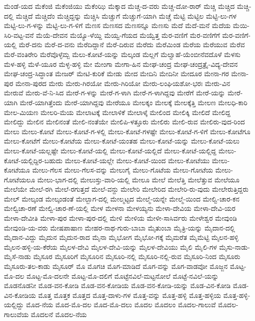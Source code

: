 ಮೆಂಡೆ-ಯದ
ಮೆಕೆಂಜಿ
ಮೆಕೆಂಜಿಯು
ಮೆಕೆಂಝಿ
ಮೆಕ್ಕಾದ
ಮೆಚ್ಚ-ದ-ವರು
ಮೆಚ್ಚ-ದೋ-ರಾರ್
ಮೆಚ್ಚಿ
ಮೆಚ್ಚಿದ
ಮೆಚ್ಚಿ-ದಲ್ಲಿ
ಮೆಚ್ಚಿದೆ
ಮೆಚ್ಚಿದೆಂ
ಮೆಚ್ಚಿದ್ದನ್ನು
ಮೆಚ್ಚಿಸಿ
ಮೆಚ್ಚುಗೆ
ಮೆಚ್ಚುಗೆ-ಯಾಗಿ
ಮೆಚ್ಚೆ
ಮೆಟ್ಟಿ
ಮೆಟ್ಟಿಲ
ಮೆಟ್ಟಿ-ಲು-ಗಳ
ಮೆಟ್ಟಿ-ಲು-ಗ-ಳನ್ನು
ಮೆಟ್ಟಿ-ಲು-ಗ-ಳಿಗೆ
ಮೆಣಸ
ಮೆಣಸದ
ಮೆಣಸನ್ನೂ
ಮೆಣಸು
ಮೆದೆ
ಮೆದೆ-ಮನೆ
ಮೆದೆಯ
ಮೆಯಿ-ಸಿರಿ-ವಟ್ಟ-ವನೆ
ಮೆಯೆ-ದೇವನ
ಮೆಯ್ಯೊ-ಳೆಯ್ದಿ
ಮೆಯ್ವ-ಗೆಯದ
ಮೆಯ್ವೆತ್ತ
ಮೆರ-ವಣಿಗೆ
ಮೆರ-ವಣಿಗೆಗೆ
ಮೆರ-ವಣಿಗೆ-ಯಲ್ಲಿ
ಮೆರೆ-ದನು
ಮೆರೆ-ದ-ವನು
ಮೆರೆದಿದ್ದಾನೆ
ಮೆರೆ-ದಿರುವ
ಮೆರೆದು
ಮೆರೆಮಿಂಡ
ಮೆರೆಯ
ಮೆರೆಯುವ
ಮೆರೆವ
ಮೆರೆ-ವಂತಿರೇರಿ
ಮೆರೆವೊಳ್ಳೆಮ್ಬ
ಮೆಲು-ಕೋಟೆ-ಯನ್ನು
ಮೆಲ್ಕಂಡ
ಮೆಲ್ಲಗೆ
ಮೆಲ್ವಾಹೆ-ಯೆಂಬೀನೆವದೊಳೆ
ಮೆಳಸು
ಮೆಳ-ಹಳ್ಳಿ
ಮೆಳೆ-ಯೂರ
ಮೆಳ್ಳ-ಹಳ್ಳಿ
ಮೇ
ಮೇಂಗಾ
ಮೇಗಾ-ಹಿನ
ಮೇಘ-ಚಂದ್ರ
ಮೇಘ-ಚಂದ್ರತ್ರೈ-ವಿದ್ಯ-ದೇವನ
ಮೇಘ-ಚಂದ್ರ-ಸಿದ್ಧಾಂತ
ಮೇಜರ್
ಮೇಟಿ-ಕುರಿಕೆ
ಮೇಡು
ಮೇದ
ಮೇದಿನಿ
ಮೇದಿನೀ
ಮೇದೂರ
ಮೇನಾ-ಗರ
ಮೇನಾ-ಪುರ
ಮೇನಾ-ಪುರದ
ಮೇರು
ಮೇರು-ಗಿರಯೋ
ಮೇರು-ಗಿರಿಯೋ
ಮೇರು-ಲಂಘಿಯಶೋ-ಭರಃ
ಮೇರು-ವಿನ
ಮೇರುವೆ
ಮೇರು-ವೆ-ನಿ-ಸಿದ
ಮೇರೆ-ಗ-ಳನ್ನು
ಮೇರೆ-ಗ-ಳಾಗಿ
ಮೇರೆ-ಗ-ಳಾಗಿದ್ದವು
ಮೇರೆಗೆ
ಮೇರೆ-ಯನ್ನು
ಮೇರೆ-ಯಾಗಿ
ಮೇರೆ-ಯಾಗಿತ್ತೆಂದು
ಮೇರೆ-ಯಾಗಿದ್ದವು
ಮೇರೆಯೂ
ಮೇಲಕ್ಕಂ
ಮೇಲಕ್ಕೆ
ಮೇಲಕ್ಕೆತ್ತಿ
ಮೇಲಣ
ಮೇಲಧಿ-ಕಾರಿ
ಮೇಲ-ಮಿಯಣ
ಮೇಲರಿ-ಮೆಯ
ಮೇಲಾಟಕ್ಕೆ
ಮೇಲಾಳಿಕೆ
ಮೇಲಾಳ್ಕೆ
ಮೇಲಿಂದ
ಮೇಲಿಕ್ಕಿ
ಮೇಲಿದೆ
ಮೇಲಿದ್ದ
ಮೇಲಿದ್ದು
ಮೇಲಿನ
ಮೇಲಿನಂತೆ
ಮೇಲಿ-ನಂತೆಯೇ
ಮೇಲಿಪಿ-ಳತ್ತೂರು
ಮೇಲಿರು
ಮೇಲಿ-ರುವ
ಮೇಲಿರು-ವುದ-ರಿಂದ
ಮೇಲು
ಮೇಲು-ಕೋಟೆ
ಮೇಲು-ಕೋಟೆ-ಗ-ಳಲ್ಲಿ
ಮೇಲು-ಕೋಟೆ-ಗಳಷ್ಟೇ
ಮೇಲು-ಕೋಟೆ-ಗ-ಳಿಗೆ
ಮೇಲು-ಕೋಟೆಗೂ
ಮೇಲು-ಕೋಟೆಗೆ
ಮೇಲು-ಕೋಟೆಯ
ಮೇಲು-ಕೋಟೆ-ಯಂತಹ
ಮೇಲು-ಕೋಟೆ-ಯನ್ನು
ಮೇಲು-ಕೋಟೆ-ಯಲು
ಮೇಲು-ಕೋಟೆ-ಯಲ್ಲಷ್ಟೇ
ಮೇಲು-ಕೋಟೆ-ಯಲ್ಲಿ
ಮೇಲು-ಕೋಟೆ-ಯಲ್ಲಿದೆ
ಮೇಲು-ಕೋಟೆ-ಯಲ್ಲಿದ್ದ
ಮೇಲು-ಕೋಟೆ-ಯಲ್ಲಿದ್ದಿರ-ಬಹುದು
ಮೇಲು-ಕೋಟೆ-ಯಲ್ಲೇ
ಮೇಲು-ಕೋಟೆ-ಯಿಂದ
ಮೇಲು-ಕೋಟೆಯು
ಮೇಲು-ಕೋಟೆಯೂ
ಮೇಲು-ಗೆಲಸ
ಮೇಲು-ಗೆಲಸ-ವನ್ನು
ಮೇಲುಗೈ
ಮೇಲು-ಗೊಟೆಯ
ಮೇಲು-ಗೋಟೆಯ
ಮೇಲು-ಗೋಟೆಯಲೂ
ಮೇಲು-ಭಾಗ-ದಲ್ಲಿ
ಮೇಲುಸ್ತು-ವಾರಿ-ಯಲ್ಲಿ
ಮೇಲೂ
ಮೇಲೆ
ಮೇಲೆತ್ತಿ
ಮೇಲೆತ್ತುವ
ಮೇಲೆಯೂ
ಮೇಲೆಯೇ
ಮೇಲೆ-ರಗಿ
ಮೇಲೆ-ರಗುತ್ತದೆ
ಮೇಲೆ-ವನ್ದು
ಮೇಲೇರಿ
ಮೇಲೇರಿದ
ಮೇಲೇರಿ-ರು-ವುದು
ಮೇಲೇರುತ್ತಿದ್ದರು
ಮೇಲ್
ಮೇಲ್ಕಂಡ
ಮೇಲ್ಕಂಡಂತೆ
ಮೇಲ್ಬಾಗ-ದಲ್ಲಿ
ಮೇಲ್ಮಟ್ಟದ
ಮೇಲ್ಮೆ-ಯನ್ನೇ
ಮೇಲ್ಮೆ-ಯಿಂದ
ಮೇಲ್ವಿ-ಚಾರ-ಕನ
ಮೇಲ್ವಿಚಾ-ರಣೆ
ಮೇಲ್ವಿ-ಚಾರ-ಣೆ-ಯಲ್ಲಿ
ಮೇಳ
ಮೇಳನಾ
ಮೇಳಯ್ಯನು
ಮೇಳಾ-ದೇವಿಯ
ಮೇಳಾ-ದೇವಿ-ಯರ
ಮೇಳಾ-ದೇವೀತಿ
ಮೇಳಾ-ಪುರ
ಮೇಳಾ-ಪುರ-ದಲ್ಲಿ
ಮೇಳಿ
ಮೇಳಿಯ
ಮೇಳೀ-ಸಾಸಿರ್ವರು
ಮೇಳೇಶ್ವರ
ಮೇವುಂಡಿ
ಮೇವುಂಡಿ-ಯ-ವರು
ಮೇಷಪಾಷಾಣ
ಮೇಹರ-ನಾಥ-ಗುರು-ಬಾಬಾ
ಮೈತುಂಬಾ
ಮೈತ್ರಿ-ಯನ್ನು
ಮೈದಾನ-ದಲ್ಲಿ
ಮೈದಾನ-ವಿದ್ದು
ಮೈದುನ
ಮೈದುನ-ರಾದ
ಮೈನಾ
ಮೈಭೋಗ
ಮೈಭೋ-ಗಕ್ಕೆ
ಮೈಮರೆತ
ಮೈಮೆಟ್ಟಿ
ಮೈಲನ-ಹಳ್ಳಿ
ಮೈಲನ-ಹಳ್ಳಿ-ಯ-ಕೆರೆಯ
ಮೈಲಳ-ದೇವಿ
ಮೈಲಳ-ದೇವಿ-ಯನ್ನು
ಮೈಲಳ-ದೇವಿಯು
ಮೈಲಿ
ಮೈಲಿ-ಗಳ
ಮೈಸು-ನಾಡು-ಮೈಸೆ-ನಾಡು
ಮೈಸೂರ
ಮೈಸೂರಿಗೆ
ಮೈಸೂರಿನ
ಮೈಸೂರಿ-ನಲ್ಲಿ
ಮೈಸೂರಿ-ನಲ್ಲಿ-ರುವ
ಮೈಸೂರಿ-ನಿಂದ
ಮೈಸೂರು
ಮೈಸೂರು-ತಲ-ಕಾಡು
ಮೈಸೂರ್
ಮೊ
ಮೊಗಚಿ
ಮೊಗ-ಮಾಡಿದೆ
ಮೊಗ-ವನ್ನು
ಮೊಗ-ವಾಡವೋ
ಮೊಜ್ಜನ
ಮೊಟ್ಟ-ಮೊ-ದಲ
ಮೊಟ್ಟ-ಮೊ-ದಲನೇ
ಮೊಟ್ಟ-ಮೊ-ದಲಿಗೆ
ಮೊಟ್ಟೆನವಿಲೆ-ಮಟ್ಟನೋಲೆ
ಮೊಟ್ಟೆ-ನವಿಲೆ-ಯನ್ನು
ಮೊಡನೊಡನೀ
ಮೊಡ-ವನ-ಕೋಡಿ
ಮೊಡ-ವನ-ಕೋಡಿಯ
ಮೊಡ-ವನ-ಕೋಡಿ-ಯನ್ನು
ಮೊಡ-ವಿನ-ಕೋಡಿ
ಮೊಡ-ವಿನ-ಕೋಡಿಯ
ಮೊತ್ತ
ಮೊತ್ತಕ
ಮೊತ್ತದ
ಮೊತ್ತ-ದಾಳು-ಗಳ
ಮೊತ್ತ-ವನ್ನು
ಮೊತ್ತ-ಹಳ್ಳಿ
ಮೊತ್ತ-ಹಳ್ಳಿಯ
ಮೊತ್ತ-ಹಳ್ಳಿ-ಯಲ್ಲಿದ್ದು
ಮೊದ-ನೆಯ
ಮೊದ-ಮೊ-ದಲ
ಮೊದ-ಮೊ-ದಲು
ಮೊದಲ
ಮೊದಲಂ
ಮೊದಲ-ಗಾಲುವೆ
ಮೊದಲ-ಗಾಲುವೆಯ
ಮೊದಲನೆ
ಮೊದಲ-ನೆಯ
